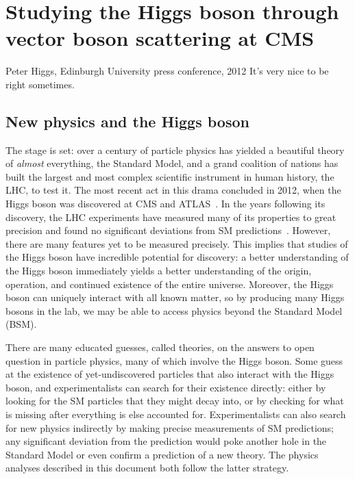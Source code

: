\chapter{Studying the Higgs boson through vector boson scattering at CMS}\label{ch:higgs_vbs}
\begin{aquote}{Peter Higgs, Edinburgh University press conference, 2012}
    It's very nice to be right sometimes.
\end{aquote}

\section{New physics and the Higgs boson}
The stage is set: over a century of particle physics has yielded a beautiful theory of \textit{almost} everything, the Standard Model, and a grand coalition of nations has built the largest and most complex scientific instrument in human history, the LHC, to test it. 
The most recent act in this drama concluded in 2012, when the Higgs boson was discovered at CMS and ATLAS~\cite{CMSdisc, ATLASdisc}. 
In the years following its discovery, the LHC experiments have measured many of its properties to great precision and found no significant deviations from SM predictions~\cite{NatureHiggsCMS2022, NatureHiggsATLAS2022}. 
However, there are many features yet to be measured precisely. 
This implies that studies of the Higgs boson have incredible potential for discovery: a better understanding of the Higgs boson immediately yields a better understanding of the origin, operation, and continued existence of the entire universe. 
Moreover, the Higgs boson can uniquely interact with all known matter, so by producing many Higgs bosons in the lab, we may be able to access physics beyond the Standard Model (BSM). %

There are many educated guesses, called theories, on the answers to open question in particle physics, many of which involve the Higgs boson. 
Some guess at the existence of yet-undiscovered particles that also interact with the Higgs boson\footnotemark{}, and experimentalists can search for their existence directly: either by looking for the SM particles that they might decay into, or by checking for what is missing after everything is else accounted for. 
Experimentalists can also search for new physics indirectly by making precise measurements of SM predictions; any significant deviation from the prediction would poke another hole in the Standard Model or even confirm a prediction of a new theory. 
The physics analyses described in this document both follow the latter strategy.

